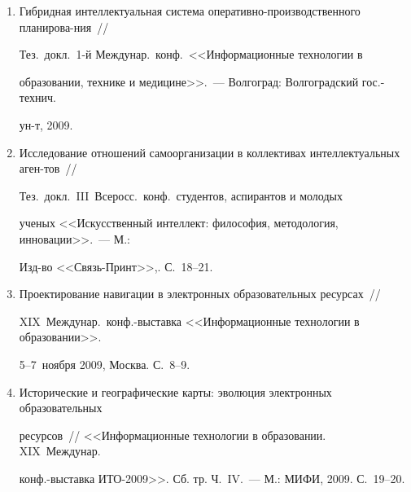 \begin{enumerate}[1.]
Научная сессия МИФИ-2009: Сб. науч.\ тр.~--- М.: МИФИ, 2009. С.~44.





\item {}


Гибридная интеллектуальная система оперативно-производственного планирова-\linebreak ния~// 


Тез.\ докл.\ 1-й Междунар.\ конф.\ <<Информационные технологии в 


образовании, технике и медицине>>.~--- Волгоград: Волгоградский гос.-технич. 


ун-т, 2009.





\item {}


Исследование отношений самоорганизации в коллективах интеллектуальных аген-\linebreak тов~// 


Тез.\ докл.\ III~Всеросс.\ конф.\ студентов, аспирантов и молодых 


ученых <<Искусственный интеллект: философия, методология, инновации>>.~--- М.: 


Изд-во <<Связь-Принт>>,. С.~18--21.





\item {}


Проектирование навигации в электронных образовательных ресурсах~// 


XIX~Междунар.\ конф.-выставка <<Информационные технологии в образовании>>. 


5--7~ноября 2009, Москва. С.~8--9.





\item {}


Исторические и географические карты: эволюция электронных образовательных 


ресурсов~// <<Информационные технологии в образовании. XIX~Междунар.\linebreak 


конф.-выставка ИТО-2009>>. Сб. тр.  Ч.~IV.~--- М.: МИФИ, 2009. С.~19--20.






\end{enumerate}
